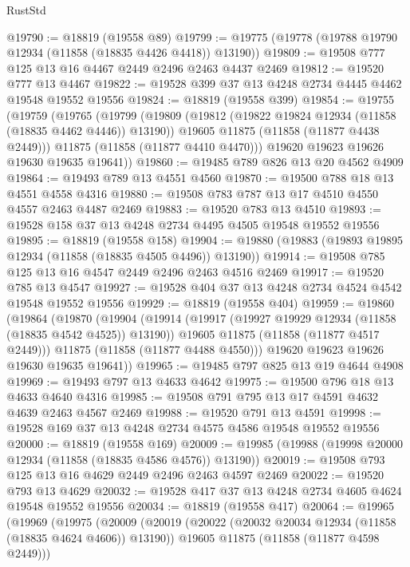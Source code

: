 \begin{lexlean}{RustStd}
\begin{coremodule}
@19790 := @18819 (@19558 @89)
@19799 := @19775 (@19778 (@19788 @19790 @12934 (@11858 (@18835 @4426 @4418)) @13190))
@19809 := @19508 @777 @125 @13 @16 @4467 @2449 @2496 @2463 @4437 @2469
@19812 := @19520 @777 @13 @4467
@19822 := @19528 @399 @37 @13 @4248 @2734 @4445 @4462 @19548 @19552 @19556
@19824 := @18819 (@19558 @399)
@19854 := @19755
    (@19759
      (@19765
        (@19799
          (@19809
            (@19812 (@19822 @19824 @12934 (@11858 (@18835 @4462 @4446)) @13190))
            @19605
            @11875
            (@11858 (@11877 @4438 @2449)))
          @11875
          (@11858 (@11877 @4410 @4470)))
        @19620
        @19623
        @19626
        @19630
        @19635
        @19641))
@19860 := @19485 @789 @826 @13 @20 @4562 @4909
@19864 := @19493 @789 @13 @4551 @4560
@19870 := @19500 @788 @18 @13 @4551 @4558 @4316
@19880 := @19508 @783 @787 @13 @17 @4510 @4550 @4557 @2463 @4487 @2469
@19883 := @19520 @783 @13 @4510
@19893 := @19528 @158 @37 @13 @4248 @2734 @4495 @4505 @19548 @19552 @19556
@19895 := @18819 (@19558 @158)
@19904 := @19880 (@19883 (@19893 @19895 @12934 (@11858 (@18835 @4505 @4496)) @13190))
@19914 := @19508 @785 @125 @13 @16 @4547 @2449 @2496 @2463 @4516 @2469
@19917 := @19520 @785 @13 @4547
@19927 := @19528 @404 @37 @13 @4248 @2734 @4524 @4542 @19548 @19552 @19556
@19929 := @18819 (@19558 @404)
@19959 := @19860
    (@19864
      (@19870
        (@19904
          (@19914
            (@19917 (@19927 @19929 @12934 (@11858 (@18835 @4542 @4525)) @13190))
            @19605
            @11875
            (@11858 (@11877 @4517 @2449)))
          @11875
          (@11858 (@11877 @4488 @4550)))
        @19620
        @19623
        @19626
        @19630
        @19635
        @19641))
@19965 := @19485 @797 @825 @13 @19 @4644 @4908
@19969 := @19493 @797 @13 @4633 @4642
@19975 := @19500 @796 @18 @13 @4633 @4640 @4316
@19985 := @19508 @791 @795 @13 @17 @4591 @4632 @4639 @2463 @4567 @2469
@19988 := @19520 @791 @13 @4591
@19998 := @19528 @169 @37 @13 @4248 @2734 @4575 @4586 @19548 @19552 @19556
@20000 := @18819 (@19558 @169)
@20009 := @19985 (@19988 (@19998 @20000 @12934 (@11858 (@18835 @4586 @4576)) @13190))
@20019 := @19508 @793 @125 @13 @16 @4629 @2449 @2496 @2463 @4597 @2469
@20022 := @19520 @793 @13 @4629
@20032 := @19528 @417 @37 @13 @4248 @2734 @4605 @4624 @19548 @19552 @19556
@20034 := @18819 (@19558 @417)
@20064 := @19965
    (@19969
      (@19975
        (@20009
          (@20019
            (@20022 (@20032 @20034 @12934 (@11858 (@18835 @4624 @4606)) @13190))
            @19605
            @11875
            (@11858 (@11877 @4598 @2449)))

\end{coremodule}
\end{lexlean}
